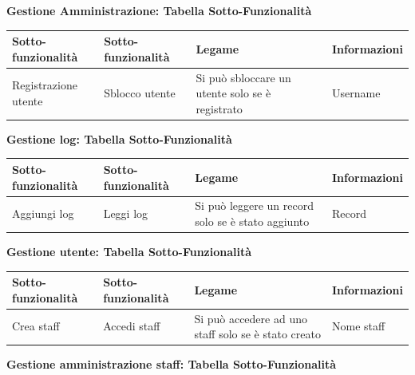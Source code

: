 \documentclass[a4paper]{article}
\begin{document}
\textbf{Gestione Amministrazione: Tabella Sotto-Funzionalità}

\begin{center}
    \begin{tabularx}{1\textwidth}{|X|X|X|X|}
    \hline
    \textbf{Sotto-funzionalità} & \textbf{Sotto-funzionalità} & \textbf{Legame} & \textbf{Informazioni}\\
    \hline
    \hline
    Registrazione utente & Sblocco utente & Si può sbloccare un utente solo se è registrato & Username\\
    \hline
    \end{tabularx}
\end{center}

\textbf{Gestione log: Tabella Sotto-Funzionalità}

\begin{center}
    \begin{tabularx}{1\textwidth}{|X|X|X|X|}
    \hline
    \textbf{Sotto-funzionalità} & \textbf{Sotto-funzionalità} & \textbf{Legame} & \textbf{Informazioni}\\
    \hline
    \hline
    Aggiungi log & Leggi log & Si può leggere un record solo se è stato aggiunto & Record\\
    \hline
    \end{tabularx}
\end{center}

\textbf{Gestione utente: Tabella Sotto-Funzionalità}

\begin{center}
    \begin{tabularx}{1\textwidth}{|X|X|X|X|}
    \hline
    \textbf{Sotto-funzionalità} & \textbf{Sotto-funzionalità} & \textbf{Legame} & \textbf{Informazioni}\\
    \hline
    \hline
    Crea staff & Accedi staff & Si può accedere ad uno staff solo se è stato creato & Nome staff\\
    \hline
    \end{tabularx}
\end{center}

\textbf{Gestione amministrazione staff: Tabella Sotto-Funzionalità}
\end{document}

